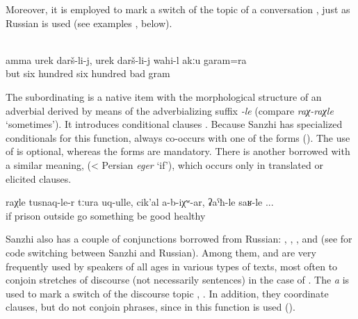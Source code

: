 Moreover, it is employed to mark a switch of the topic of a conversation , just as Russian  is used (see examples ,  below).

\begin{exe}
	\label{ex:‎But for 600, for 600, that is not bad at all minor}\\
	\gll	amma	urek	darš-li-j,	urek	darš-li-j	wahi-l	akːu	garam=ra\\
		but	six	hundred	six	hundred	bad		gram\\
	\glt	{}
\end{exe}

The subordinating    is a native item with the morphological structure of an adverbial derived by means of the adverbializing suffix \textit{-le} (compare \textit{raχ-raχle} `sometimes'). It introduces conditional clauses . Because Sanzhi has specialized conditionals for this function,  always co-occurs with one of the  forms (). The use of  is optional, whereas the  forms are mandatory. There is another borrowed  with a similar meaning,  (< Persian \textit{eger} `if'), which occurs only in translated or elicited clauses.

\begin{exe}
	\ex	\label{ex:‎If I leave prison well, healthy, if nothing happens to me minor}
	\gll	raχle	tusnaq-le-r	tːura	uq-ulle,	cik'al	a-b-iχʷ-ar,	ʡaˁħ-le	saʁ-le ...\\
		if	prison	outside	go	something	be	good\tsc{-advz}	healthy\\
	\glt	{}
\end{exe}

Sanzhi also has a couple of conjunctions borrowed from Russian:  ,  ,  , and   (see \citet{ForkerSubmitteda} for code switching between Sanzhi and Russian). Among them,  and  are very frequently used by speakers of all ages in various types of texts, most often to conjoin stretches of discourse (not necessarily sentences) in the case of . The  \textit{a} is used to mark a switch of the discourse topic , . In addition, they coordinate clauses, but do not conjoin phrases, since in this function  is used ().

